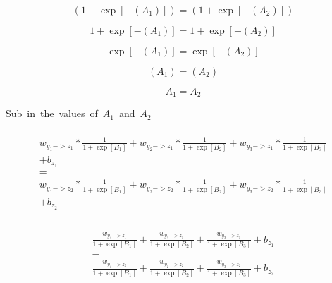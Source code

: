 \documentclass{article}
\begin{document}
\begin{equation}
    (1+\exp[- (A_1)])
        =
    (1+\exp[- (A_2)])
\end{equation}

\begin{equation}
    1+\exp[- (A_1)]
        =
    1+\exp[- (A_2)]
\end{equation}

\begin{equation}
    \exp[- (A_1)]
        =
    \exp[- (A_2)]
\end{equation}

\begin{equation}
    (A_1)
        =
    (A_2)
\end{equation}

\begin{equation}
    A_1
        =
    A_2
\end{equation}

\hbox{Sub in the values of $A_1$ and $A_2$}

\begin{multline}
    \\
        w_{y_1->z_1}* \frac{1}{1+\exp[B_1]}
        + w_{y_2->z_1}* \frac{1}{1+\exp[B_2]}
        + w_{y_3->z_1}* \frac{1}{1+\exp[B_3]}\\
        + b_{z_1}
        \\=\\
        w_{y_1->z_2}* \frac{1}{1+\exp[B_1]}
        + w_{y_2->z_2}*\frac{1}{1+\exp[B_2]}
        + w_{y_3->z_2}*\frac{1}{1+\exp[B_3]}\\
        + b_{z_2}
    \\
\end{multline}


\begin{multline}
    \\
        \frac{w_{y_1->z_1}}{1+\exp[B_1]}
        + \frac{w_{y_2->z_1}}{1+\exp[B_2]}
        + \frac{w_{y_3->z_1}}{1+\exp[B_3]}
        + b_{z_1}
        \\=\\
        \frac{w_{y_1->z_2}}{1+\exp[B_1]}
        + \frac{w_{y_2->z_2}}{1+\exp[B_2]}
        + \frac{w_{y_3->z_2}}{1+\exp[B_3]}
        + b_{z_2}
    \\
\end{multline}
\end{document}
